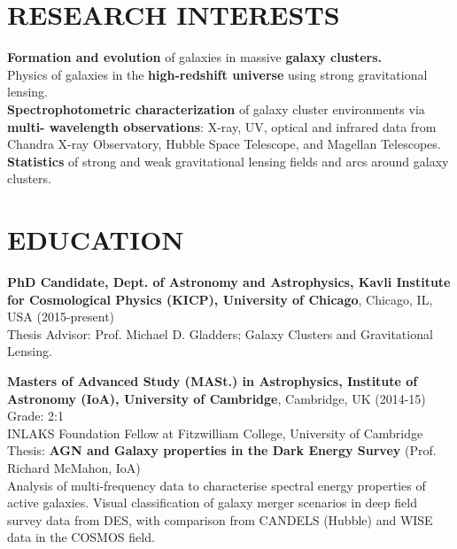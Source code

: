 \documentclass[margin]{res}
\begin{document}
\begin{resume}

\section{RESEARCH INTERESTS}
{\bf Formation and evolution} of galaxies in massive {\bf galaxy clusters.}\\
Physics of galaxies in the {\bf high-redshift universe} using strong gravitational lensing.\\
{\bf Spectrophotometric characterization} of galaxy cluster environments via {\bf multi- wavelength observations}: X-ray, UV, optical and infrared data from Chandra X-ray Observatory, Hubble Space Telescope, and Magellan Telescopes.\\
{\bf Statistics} of strong and weak gravitational lensing fields and arcs around galaxy clusters.

\section{EDUCATION}
\textbf{PhD Candidate, Dept. of Astronomy and Astrophysics, Kavli Institute for Cosmological Physics (KICP), University of Chicago}, Chicago, IL, USA (2015-present)\\
Thesis Advisor: Prof. Michael D. Gladders; Galaxy Clusters and Gravitational Lensing.

\textbf{Masters of Advanced Study (MASt.) in Astrophysics, Institute of Astronomy (IoA), University of Cambridge}, Cambridge, UK (2014-15) \hfill 
Grade: 2:1\\
INLAKS Foundation Fellow at Fitzwilliam College, University of Cambridge\\
Thesis: \textbf{AGN and Galaxy properties in the Dark Energy Survey} (Prof. Richard McMahon, IoA)\\
Analysis of multi-frequency data to characterise spectral energy properties of active galaxies. Visual classification of galaxy merger scenarios in deep field survey data from DES, with comparison from CANDELS (Hubble) and WISE data in the COSMOS field.


\end{resume}
\end{document}
